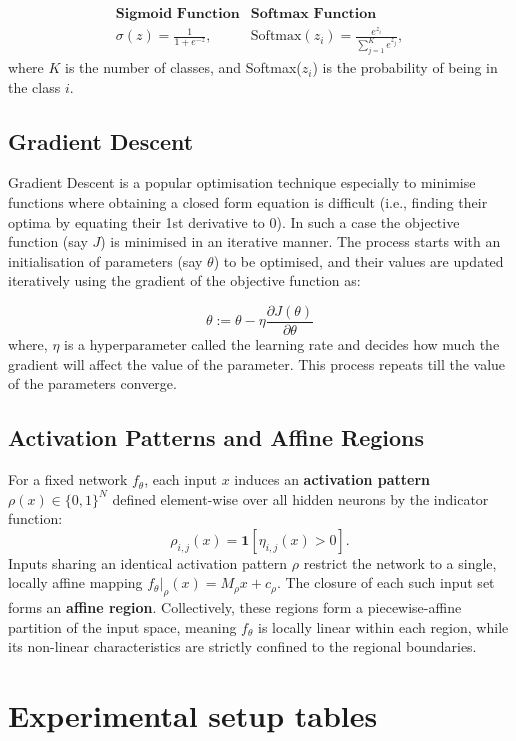 \documentclass[runningheads,orivec]{llncs}
\begin{document}
\[
\begin{array}{cc}
\textbf{Sigmoid Function} & \textbf{Softmax Function} \\[8pt]
\sigma(z)=\frac{1}{1+e^{-z}},
&
\text{Softmax}(z_i)=\frac{e^{z_i}}{\sum_{j=1}^{K} e^{z_j}},
\end{array}
\]
where $K$ is the number of classes, and Softmax($z_i$) is the probability of being in the class $i$.

\subsection{Gradient Descent}
\label{app:prelim:graddesc}
Gradient Descent is a popular optimisation technique especially to minimise functions where obtaining a closed form equation is difficult (i.e., finding their optima by equating their 1st derivative to 0). In such a case the objective function (say $J$) is minimised in an iterative manner. The process starts with an initialisation of parameters (say $\theta$) to be optimised, and their values are updated iteratively using the gradient of the objective function as:

\[
\theta := \theta - \eta \frac{\partial J(\theta)}{\partial \theta}
\]
where, $\eta$ is a hyperparameter called the learning rate and decides how much the gradient will affect the value of the parameter.
This process repeats till the value of the parameters converge.


\subsection{Activation Patterns and Affine Regions}
\label{app:prelim:dual}
For a fixed network $f_\theta$, each input $x$ induces an \textbf{activation pattern} $\rho(x) \in \{0,1\}^N$ defined element-wise over all hidden neurons by the indicator function:
\begin{equation}
    \rho_{i,j}(x) = \mathbf{1}\left[\eta_{i,j}(x) > 0\right].
\end{equation}
Inputs sharing an identical activation pattern $\rho$ restrict the network to a single, locally affine mapping $f_\theta|_\rho(x) = M_\rho x + c_\rho$. The closure of each such input set forms an \textbf{affine region}. Collectively, these regions form a piecewise-affine partition of the input space, meaning $f_\theta$ is locally linear within each region, while its non-linear characteristics are strictly confined to the regional boundaries.

\section{Experimental setup tables}
\label{app:exp:setup}
\end{document}
